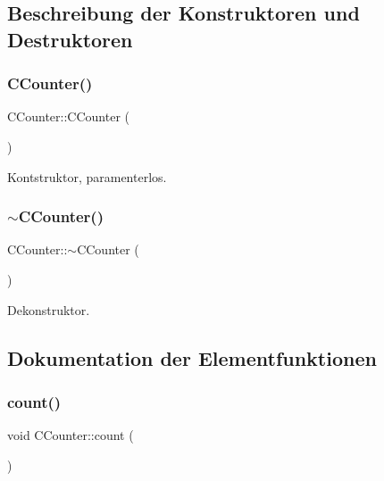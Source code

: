 \subsection{Beschreibung der Konstruktoren und Destruktoren}
\mbox{\label{class_c_counter_ab83c6f9600beb5686747493da731a04c}} 
\subsubsection{\texorpdfstring{C\+Counter()}{CCounter()}}
{\footnotesize\ttfamily C\+Counter\+::\+C\+Counter (\begin{DoxyParamCaption}{ }\end{DoxyParamCaption})}



Kontstruktor, paramenterlos. 

\mbox{\label{class_c_counter_a1af3cc000781fcd67b9e4fe1b25fbc9c}} 
\subsubsection{\texorpdfstring{$\sim$\+C\+Counter()}{~CCounter()}}
{\footnotesize\ttfamily C\+Counter\+::$\sim$\+C\+Counter (\begin{DoxyParamCaption}{ }\end{DoxyParamCaption})\hspace{0.3cm}{\ttfamily [virtual]}}



Dekonstruktor. 



\subsection{Dokumentation der Elementfunktionen}
\mbox{\label{class_c_counter_a90f3e164f3fc1dcf91044702d6940c4d}} 
\subsubsection{\texorpdfstring{count()}{count()}}
{\footnotesize\ttfamily void C\+Counter\+::count (\begin{DoxyParamCaption}{ }\end{DoxyParamCaption})\hspace{0.3cm}{\ttfamily [virtual]}}



